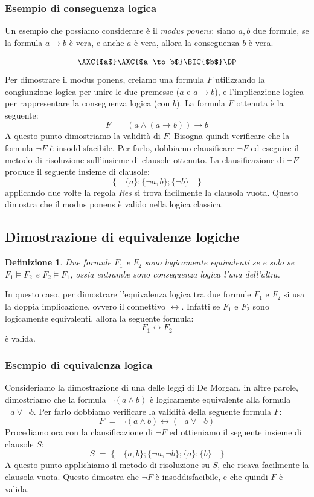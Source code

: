\documentclass[a4paper,12pt]{report}
\newcommand{\tto} {\leftrightarrow}
\newtheorem{definition}{Definizione}[section]
\begin{document}
\subsubsection{Esempio di conseguenza logica}
Un esempio che possiamo considerare è il \emph{modus ponens}: siano $a, b$ due formule, se la formula $a \to b$ è vera, e anche $a$ è vera, allora la conseguenza $b$ è vera.

\[
    \AXC{$a$}
    \AXC{$a \to b$}
    \RightLabel{Modus ponens}
    \BIC{$b$}
    \DP
\]
Per dimostrare il modus ponens, creiamo una formula $F$ utilizzando la congiunzione logica per unire le due premesse ($a$ e $a \to b$), e l'implicazione logica per rappresentare la conseguenza logica (con $b$). La formula $F$ ottenuta è la seguente:
\[
    F \; = \; (a \land (a \to b)) \to b
\]
A questo punto dimostriamo la validità di $F$. Bisogna quindi verificare che la formula $\lnot F$ è insoddisfacibile. Per farlo, dobbiamo clausificare $\lnot F$ ed eseguire il metodo di risoluzione sull'insieme di clausole ottenuto. La clausificazione di $\lnot F$ produce il seguente insieme di clausole:
\[
    \{\quad \{a\}; \{\lnot a, b\}; \{\lnot b\} \quad\}
\]
applicando due volte la regola \emph{Res} si trova facilmente la clausola vuota. Questo dimostra che il modus ponens è valido nella logica classica.

\subsection{Dimostrazione di equivalenze logiche}
\begin{definition}
    Due formule $F_1$ e $F_2$ sono logicamente equivalenti se e solo se $F_1 \models F_2$ e $F_2 \models F_1$, ossia entrambe sono conseguenza logica l'una dell'altra. 
\end{definition}
In questo caso, per dimostrare l'equivalenza logica tra due formule $F_1$ e $F_2$ si usa la doppia implicazione, ovvero il connettivo $\tto$. Infatti se $F_1$ e $F_2$ sono logicamente equivalenti, allora la seguente formula:
\[
    F_1 \tto F_2
\] 
è valida.
\subsubsection{Esempio di equivalenza logica}
Consideriamo la dimostrazione di una delle leggi di De Morgan, in altre parole, dimostriamo che la formula $\lnot(a \land b)$ è logicamente equivalente alla formula $\lnot a \lor \lnot b$. Per farlo dobbiamo verificare la validità della seguente formula $F$:
\[
    F \; = \; \lnot(a \land b) \tto (\lnot a \lor \lnot b)
\]
Procediamo ora con la clausificazione di $\lnot F$ ed ottieniamo il seguente insieme di clausole $S$:
\[
    S \; = \; \{\quad \{a, b\}; \{\lnot a, \lnot b\}; \{a\}; \{b\} \quad\}
\]
A questo punto applichiamo il metodo di risoluzione su $S$, che ricava facilmente la clausola vuota. Questo dimostra che $\lnot F$ è insoddisfacibile, e che quindi $F$ è valida.
\end{document}
